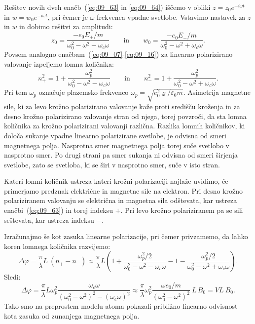Rešitev novih dveh enačb~(\ref{eq:09_63} in \ref{eq:09_64}) 
iščemo v obliki $z = z_0 e^{-i\omega t}$ in $w = w_0 e^{-i\omega t}$, pri čemer
je $\omega$ frekvenca vpadne svetlobe. Vstavimo nastavek za $z$ in $w$ in dobimo rešitvi za amplitudi:
\begin{equation}
z_0 = \frac{-e_0 E_+/m}{\omega_0^2 - \omega^2 - \omega_{c}\omega} \qquad \mathrm{in} \qquad 
w_0 = \frac{-e_0 E_-/m}{\omega_0^2 - \omega^2 + \omega_{c}\omega}.
\label{eq:09_65}
\end{equation}
Povsem analogno enačbam~(\ref{eq:09_07}-\ref{eq:09_16}) za linearno polarizirano 
valovanje izpeljemo lomna količnika:
\begin{equation}
n_+^2 = 1 + \frac{\omega_p^2}{\omega_0^2 -\omega^2 - \omega_{c}\omega} \qquad \mathrm{in}
\qquad 
n_-^2 = 1 + \frac{\omega_p^2}{\omega_0^2 -\omega^2 + \omega_{c}\omega}.
\label{eq:09_66}
\end{equation}
Pri tem $\omega_p$ označuje plazemsko frekvenco $\omega_p = \sqrt{e_0^2 \varrho/\varepsilon_0 m}$. 
Asimetrija magnetne sile, ki za levo krožno polarizirano valovanje kaže proti
središču kroženja in za desno krožno polarizirano valovanje stran od njega, 
torej povzroči, da sta lomna količnika za krožno polarizirani valovanji različna. 
Razlika lomnih količnikov, ki določa sukanje vpadne linearno polarizirane svetlobe,
je odvisna od smeri magnetnega polja. Nasprotna smer magnetnega polja torej suče svetlobo
v nasprotno smer. Po drugi strani pa smer sukanja ni odvisna od smeri širjenja svetlobe, 
zato se svetloba, ki se širi v nasprotno smer, suče v isto stran.

Kateri lomni količnik ustreza kateri krožni polarizaciji najlaže uvidimo, če primerjamo
predznak električne in magnetne sile na elektron. Pri desno krožno polariziranem 
valovanju se električna in magnetna sila odštevata, kar ustreza enačbi~(\ref{eq:09_63})
in torej indeksu $+$. Pri levo krožno polariziranem pa se sili seštevata, kar ustreza
indeksu $-$.

Izračunajmo še kot zasuka linearne polarizacije,  pri čemer
privzamemo, da lahko koren lomnega količnika razvijemo:
\begin{equation}
\Delta \varphi = \frac{\pi}{\lambda} L~(n_+-n_-) \approx \frac{\pi}{\lambda} L
\left(1 + \frac{\omega_p^2/2}{\omega_0^2 -\omega^2 - \omega_{c}\omega}- 
1 - \frac{\omega_p^2/2}{\omega_0^2 -\omega^2 + \omega_{c}\omega}\right)\!\!.
\end{equation}
Sledi:
\begin{equation}
\Delta \varphi = \frac{\pi}{\lambda} L \omega_p^2
\frac{\omega_c\omega}{\left(\omega_0^2 -\omega^2\right)^2 - \left(\omega_{c}\omega\right)^2}
\approx \frac{\pi}{\lambda} \omega_p^2 \frac{\omega e_0 /m}{\left(\omega_0^2 -\omega^2\right)^2}~L\,B_0
= V L~B_0.
\end{equation}
Tako smo na preprostem modelu atoma pokazali približno linearno odvisnost kota zasuka od zunanjega 
magnetnega polja.
